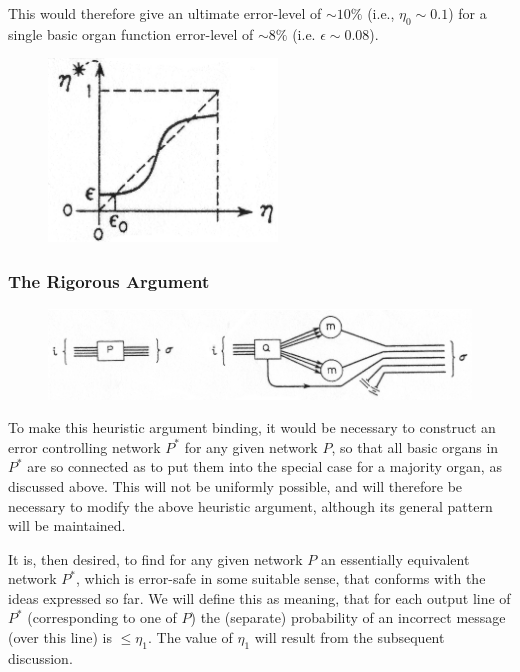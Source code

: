 \documentclass[twocolumn,preprintnumbers,amsmath,amssymb,floatfix]{revtex4}
\begin{document}
\noindent This would therefore give an ultimate error-level of
$\sim 10 \%$ (i.e., $\eta_0 \sim 0.1$) for a single basic organ
function error-level of $\sim 8 \%$ (i.e. $\epsilon\sim 0.08$).

\begin{figure}
\includegraphics[width=2.4in]{fig_27}
\caption{\label{fig:27}}
\end{figure}

\subsubsection{\label{sec:eight3_2}The Rigorous Argument}

\begin{figure}
\includegraphics[width=5.6in]{fig_28}
\caption{\label{fig:28}}
\end{figure}

To make this heuristic argument binding, it would be necessary to
construct an error controlling network $P^*$ for any given network
$P$, so that all basic organs in $P^*$ are so connected as to put
them into the special case for a majority organ, as discussed
above. This will not be uniformly possible, and will therefore be
necessary to modify the above heuristic argument, although its
general pattern will be maintained.

It is, then desired, to find for any given network $P$ an
essentially equivalent network $P^*$, which is error-safe in some
suitable sense, that conforms with the ideas expressed so far. We
will define this as meaning, that for each output line of $P^*$
(corresponding to one of $P$) the (separate) probability of an
incorrect message (over this line) is $\leq \eta_1$. The value of
$\eta_1$ will result from the subsequent discussion.
\end{document}
